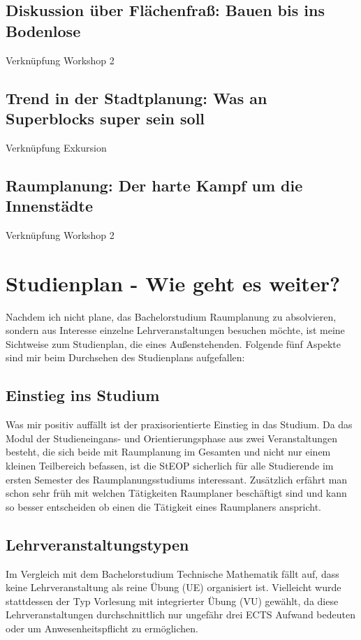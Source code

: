 \documentclass[]{article}
\begin{document}
\subsection{Diskussion über Flächenfraß: Bauen bis ins Bodenlose}
Verknüpfung Workshop 2

\subsection{Trend in der Stadtplanung: Was an Superblocks super sein soll}
Verknüpfung Exkursion

\subsection{Raumplanung: Der harte Kampf um die Innenstädte}
Verknüpfung Workshop 2

\section{Studienplan - Wie geht es weiter?}
Nachdem ich nicht plane, das Bachelorstudium Raumplanung zu absolvieren, sondern aus Interesse einzelne Lehrveranstaltungen besuchen möchte, ist meine Sichtweise zum Studienplan, die eines Außenstehenden. Folgende fünf Aspekte sind mir beim Durchsehen des Studienplans aufgefallen:

\subsection{Einstieg ins Studium}
Was mir positiv auffällt ist der praxisorientierte Einstieg in das Studium. Da das Modul der Studieneingans- und Orientierungsphase aus zwei Veranstaltungen besteht, die sich beide mit Raumplanung im Gesamten und nicht nur einem kleinen Teilbereich befassen, ist die StEOP sicherlich für alle Studierende im ersten Semester des Raumplanungsstudiums interessant. Zusätzlich erfährt man schon sehr früh mit welchen Tätigkeiten Raumplaner beschäftigt sind und kann so besser entscheiden ob einen die Tätigkeit eines Raumplaners anspricht.

\subsection{Lehrveranstaltungstypen}
Im Vergleich mit dem Bachelorstudium Technische Mathematik fällt auf, dass keine Lehrveranstaltung als reine Übung (UE) organisiert ist. Vielleicht wurde stattdessen der Typ Vorlesung mit integrierter Übung (VU) gewählt, da diese Lehrveranstaltungen durchschnittlich nur ungefähr drei ECTS Aufwand bedeuten oder um Anwesenheitspflicht zu ermöglichen.
\end{document}
